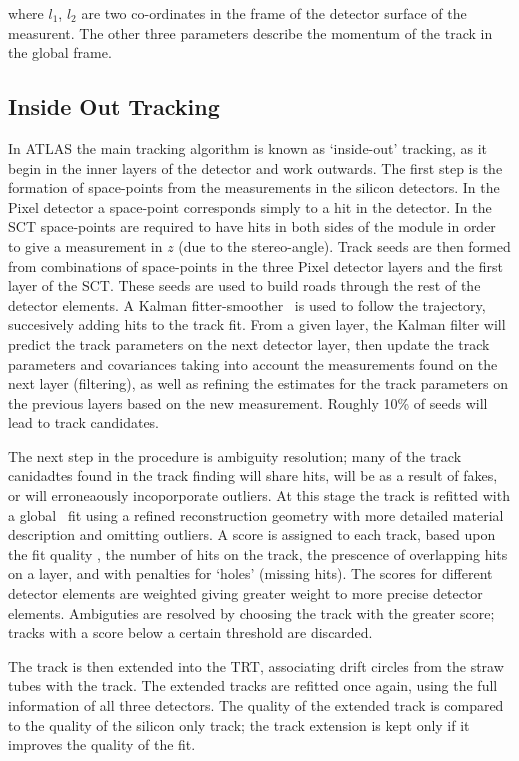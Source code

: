 where $l_{1}$, $l_{2}$ are two co-ordinates in the frame of the detector surface
of the measurent. The other three parameters describe the momentum of the track
in the global frame.

\subsection{Inside Out Tracking}

In ATLAS the main tracking algorithm is known as `inside-out' tracking, as it
begin in the inner layers of the detector and work outwards. The first step is
the formation of space-points from the measurements in the silicon detectors. In
the Pixel detector a space-point corresponds simply to a hit in the detector. In
the SCT space-points are required to have hits in both sides of the module in
order to give a measurement in $z$ (due to the stereo-angle). Track seeds are
then formed from combinations of space-points in the three Pixel detector layers
and the first layer of the SCT. These seeds are used to build roads through the
rest of the detector elements. A Kalman fitter-smoother~\cite{Fruhwirth:1987fm} is used to follow the
trajectory, succesively adding hits to the track fit. From a given layer, the
Kalman filter will predict the track parameters on the next detector layer, then
update the track parameters and covariances taking into account the measurements
found on the next layer (filtering), as well as refining the estimates for the
track parameters on the previous layers based on the new measurement. Roughly
10\% of seeds will lead to track candidates.

The next step in the procedure is ambiguity resolution; many of the track
canidadtes found in the track finding will share hits, will be as a result of
fakes, or will erroneaously incoporporate outliers. At this stage the track is
refitted with a global \chisquared\ fit using a refined reconstruction geometry
with more detailed material description and omitting outliers. 
A score is assigned to each track, based upon the fit quality \chisquaredndof,
the number of hits on the track, the prescence of overlapping hits on a layer,
and with
penalties for `holes' (missing hits). The scores for different detector elements
are weighted giving greater weight to more precise detector elements. Ambiguties
are resolved by choosing the track with the greater score; tracks with a score
below a certain threshold are discarded.

The track is then extended into the TRT, associating drift circles from the
straw tubes with the track. The extended tracks are refitted once again, using
the full information of all three detectors. The quality of the extended track
is compared to the quality of the silicon only track; the track extension is
kept only if it improves the quality of the fit.

